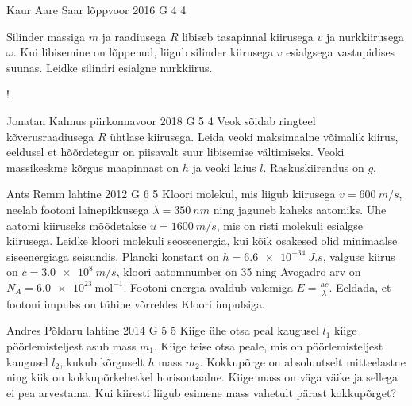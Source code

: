 \documentclass[11pt]{article}
\begin{document}
{%
{Kaur Aare Saar} %
{lõppvoor} %
{2016} %
{G 4} %
{4} %
{
\ifStatement
Silinder massiga $m$ ja raadiusega $R$ libiseb tasapinnal kiirusega $v$ ja nurkkiirusega $\omega$. Kui libisemine on lõppenud, liigub silinder kiirusega $v$ esialgsega vastupidises suunas. Leidke silindri esialgne nurkkiirus.

\begin{center}
	\begin{resizebox}{0.35\linewidth}{!}{
			}
	\end{resizebox}
\end{center}
\fi
}

{Jonatan Kalmus} %
{piirkonnavoor} %
{2018} %
{G 5} %
{4} %
{
\ifStatement
Veok sõidab ringteel kõverusraadiusega $R$ ühtlase kiirusega. Leida veoki maksimaalne võimalik kiirus, eeldusel et hõõrdetegur on piisavalt suur libisemise vältimiseks. Veoki massikeskme kõrgus maapinnast on $h$ ja veoki laius $l$. Raskuskiirendus on $g$.
\fi
}

{Ants Remm} %
{lahtine} %
{2012} %
{G 6} %
{5} %
{
\ifStatement
Kloori molekul, mis liigub kiirusega $v = \SI{600}{m/s}$, neelab
footoni lainepikkusega $\lambda = \SI{350}{nm}$ ning jaguneb kaheks aatomiks.
Ühe aatomi kiiruseks
mõõdetakse $ u = \SI{1600}{m/s}$, mis on risti molekuli esialgse
kiirusega. Leidke kloori molekuli seoseenergia, kui kõik osakesed olid
minimaalse siseenergiaga seisundis. Plancki konstant on $h =
\SI{6,6e-34}{J.s}$, valguse kiirus on $c = \SI{3,0e8}{m/s}$, kloori aatomnumber on 35 ning Avogadro arv on $N_A
= \SI{6,0e23}{\text{mol}^{-1}}$. Footoni energia avaldub valemiga $E =
\frac{h c}{\lambda}$. Eeldada, et footoni impulss on tühine võrreldes Kloori impulsiga.
\fi
}

{Andres Põldaru} %
{lahtine} %
{2014} %
{G 5} %
{5} %
{
\ifStatement
Kiige ühe otsa peal kaugusel $l_1$ kiige pöörlemisteljest asub mass $m_1$. Kiige teise otsa peale, mis on pöörlemisteljest kaugusel $l_2$, kukub kõrguselt $h$ mass $m_2$. Kokkupõrge on absoluutselt mitteelastne ning kiik on kokkupõrkehetkel horisontaalne. Kiige mass on väga väike ja sellega ei pea arvestama. Kui kiiresti liigub esimene mass vahetult pärast kokkupõrget?
\fi
}

}
\end{document}
